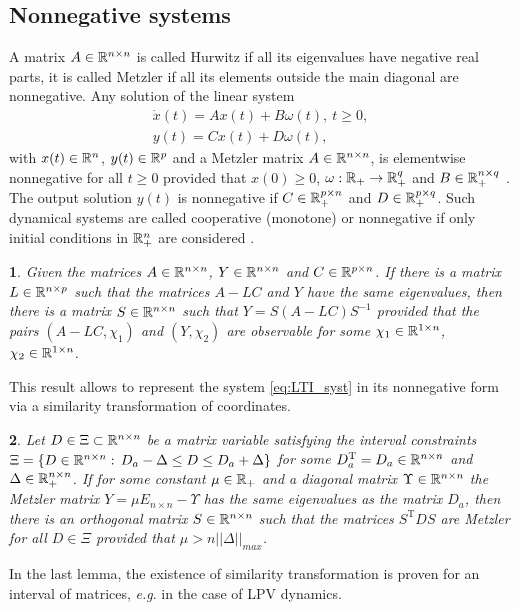 \documentclass[twocolumn,english]{IEEEtran}
\theoremstyle{plain}
\newtheorem{lem}{\protect\lemmaname}
\theoremstyle{definition}
\theoremstyle{plain}
\theoremstyle{plain}
\theoremstyle{remark}
\providecommand{\lemmaname}{Lemma}
\begin{document}
\subsection{Nonnegative systems}

A matrix $A\in\mathbb{R}^{n\times n}$ is called Hurwitz if all its eigenvalues have negative real parts, it is called Metzler if all its elements outside the main diagonal are nonnegative. Any solution of the linear system
\begin{gather}
\dot{x}(t)=Ax(t)+B\omega(t),\:t\geq0,\label{eq:LTI_syst}\\
y(t)=Cx(t)+D\omega(t),\nonumber 
\end{gather}
with $x(t)\in\mathbb{R}^{n}$, $y(t)\in\mathbb{R}^{p}$ and a Metzler matrix $A\in\mathbb{R}^{n\times n}$, is elementwise nonnegative for all $t\ge0$ provided that $x(0)\ge0$, $\omega:\mathbb{R}_{+}\to\mathbb{R}_{+}^{q}$ and $B\in\mathbb{R}_{+}^{n\times q}$ \cite{FarinaRinaldi2000,Smith95}. The output solution $y(t)$ is nonnegative if $C\in\mathbb{R}_{+}^{p\times n}$ and $D\in\mathbb{R}_{+}^{p\times q}$. Such dynamical systems are called cooperative (monotone) or nonnegative if only initial conditions in $\mathbb{R}_{+}^{n}$ are considered \cite{FarinaRinaldi2000,Smith95}.
\begin{lem}
\label{lem:l2}\textup{\cite{REZ11}} Given the matrices $A\in\mathbb{R}^{n\times n}$, $Y\in\mathbb{R}^{n\times n}$ and \textup{$C\in\mathbb{R}^{p\times n}$. }If there is a matrix \textup{$L\in\mathbb{R}^{n\times p}$} such that the matrices $A-LC$ and $Y$ have the same eigenvalues, then there is a matrix $S\in\mathbb{R}^{n\times n}$ such that $Y=S(A-LC)S^{-1}$ provided that the pairs $(A-LC,\chi_{1})$ and $(Y,\chi_{2})$ are observable for some $\chi_{1}\in\mathbb{R}^{1\times n}$, $\chi_{2}\in\mathbb{R}^{1\times n}$.\textup{ }
\end{lem}
This result allows to represent the system \eqref{eq:LTI_syst} in its nonnegative form via a similarity transformation of coordinates.
\begin{lem}
\label{lem:l3}\textup{\cite{Efimov_a2013}} Let $D\in\Xi\subset\mathbb{R}^{n\times n}$ be a matrix variable satisfying the interval constraints $\Xi=\{D\in\mathbb{R}^{n\times n}:\,D_{a}-\Delta\le D\le D_{a}+\Delta\}$ for some $D_{a}^{\text{T}}=D_{a}\in\mathbb{R}^{n\times n}$ and $\Delta\in\mathbb{R}_{+}^{n\times n}$. If for some constant $\mu\in\mathbb{R}_{+}$ and a diagonal matrix $\Upsilon\in\mathbb{R}^{n\times n}$ the Metzler matrix $Y=\mu E_{n\times n}-\Upsilon$ has the same eigenvalues as the matrix $D_{a}$, then there is an orthogonal matrix $S\in\mathbb{R}^{n\times n}$ such that the matrices $S^{\text{T}}DS$ are Metzler for all $D\in\Xi$ provided that $\mu>n||\Delta||_{max}$.\textup{ }
\end{lem}
In the last lemma, the existence of similarity transformation is proven for an interval of matrices, \emph{e.g}. in the case of LPV dynamics.
\end{document}
